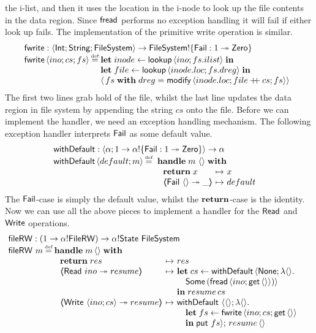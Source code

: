 \documentclass[12pt,phd,lfcs,twoside,openright,logo,leftchapter,normalheadings]{infthesis}
\theoremstyle{plain}
\theoremstyle{definition}
\begin{document}
the i-list, and then it uses the location in the i-node to look up the
file contents in the data region. Since $\mathsf{fread}$ performs no exception
handling it will fail if either look up fails. The implementation of
the primitive write operation is similar.
%
\[
  \bl
    \fwrite : \Record{\Int;\String;\FileSystem} \to \FileSystem \eff \{\Fail : \UnitType \opto \Zero\}\\
    \fwrite\,\Record{ino;cs;fs} \defas
      \ba[t]{@{}l}
        \Let\;inode \revto \lookup\,\Record{ino; fs.ilist}\;\In\\
        \Let\;file \revto \lookup\,\Record{inode.loc; fs.dreg}\;\In\\
        \Record{\,fs\;\keyw{with}\;dreg = \modify\,\Record{inode.loc;file \concat cs;fs}}
      \el
  \el
\]
%
The first two lines grab hold of the file, whilst the last line
updates the data region in file system by appending the string $cs$
onto the file.
%
Before we can implement the handler, we need an exception handling
mechanism. The following exception handler interprets $\mathsf{Fail}$ as some
default value.
%
\[
    \bl
      \faild : \Record{\alpha;\UnitType \to \alpha \eff \{\Fail : \UnitType \opto \Zero\}} \to \alpha\\
      \faild\,\Record{default;m} \defas
        \ba[t]{@{~}l}
          \Handle\;m~\Unit\;\With\\
           ~\ba{@{~}l@{~}c@{~}l}
              \Return\;x &\mapsto& x\\
              \OpCase{\Fail}{\Unit}{\_} &\mapsto& default
            \ea
        \ea
    \el
\]
%
The $\mathsf{Fail}$-case is simply the default value, whilst the
$\mathbf{return}$-case is the identity.
%
Now we can use all the above pieces to implement a handler for the
$\mathsf{Read}$ and $\mathsf{Write}$ operations.
%
\[
  \bl
    \fileRW : (\UnitType \to \alpha \eff \dec{FileRW}) \to \alpha \eff \State~\FileSystem\\
    \fileRW~m \defas
        \ba[t]{@{}l}
           \Handle\;m\,\Unit\;\With\\
             ~\ba{@{~}l@{~}c@{~}l}
                 \Return\;res      &\mapsto& res\\
                 \OpCase{\URead}{ino}{resume} &\mapsto&
                   \bl
                   \Let\;cs\revto \faild\,\Record{\None;\lambda\Unit.\\
                     \quad\Some\,(\fread\,\Record{ino;\Uget\,\Unit})}\\
                     \In\;resume\,cs
                   \el\\
                 \OpCase{\UWrite}{\Record{ino;cs}}{resume} &\mapsto&
                     \ba[t]{@{}l}
                        \faild~\Record{\Unit; \lambda \Unit.\\
                          \quad\bl
                            \Let\;fs \revto \fwrite\,\Record{ino;cs;\Uget\,\Unit}\\
                            \In\;\Uput~fs};\,resume\,\Unit
                          \el
                     \ea
               \ea
         \ea
  \el
\]
\end{document}
